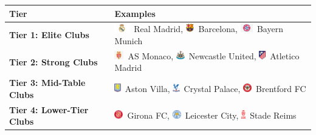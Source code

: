\documentclass[t,aspectratio=169,xcolor=dvipsnames]{beamer}
\begin{document}
\begin{frame}
{\begin{tabular}{|l|l|}
\hline
\textbf{Tier} & \textbf{Examples} \\
\hline
\textbf{Tier 1: Elite Clubs} & 
\includegraphics[height=1em]{badges/real_madrid.png}~Real Madrid, 
\includegraphics[height=1em]{badges/barcelona.png}~Barcelona, 
\includegraphics[height=1em]{badges/bayern.png}~Bayern Munich \\
\hline
\textbf{Tier 2: Strong Clubs} & 
\includegraphics[height=1em]{badges/monaco.png}~AS Monaco, 
\includegraphics[height=1em]{badges/newcastle.png}~Newcastle United, 
\includegraphics[height=1em]{badges/atletico.png}~Atletico Madrid \\
\hline
\textbf{Tier 3: Mid-Table Clubs} & 
\includegraphics[height=1em]{badges/aston_villa.png}~Aston Villa, 
\includegraphics[height=1em]{badges/crystal_palace.png}~Crystal Palace, 
\includegraphics[height=1em]{badges/brentford.png}~Brentford FC \\
\hline
\textbf{Tier 4: Lower-Tier Clubs} & 
\includegraphics[height=1em]{badges/girona.png}~Girona FC, 
\includegraphics[height=1em]{badges/leicester.png}~Leicester City, 
\includegraphics[height=1em]{badges/reims.png}~Stade Reims \\

\end{tabular}}
\end{frame}
\end{document}
